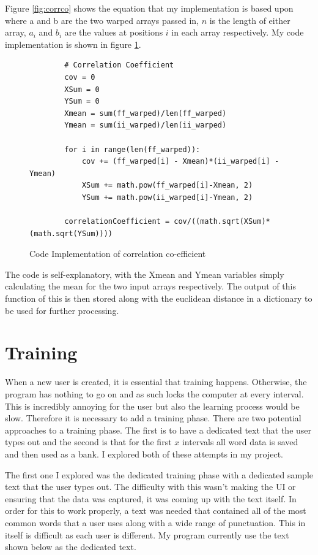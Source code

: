 \documentclass[10pt,a4paper]{report}
\begin{document}
Figure \ref{fig:corrco} shows the equation that my implementation is based upon where a and b are the two warped arrays passed in, \(n\) is the length of either array, \(a_i\) and \(b_i\) are the values at positions \(i\) in each array respectively. My code implementation is shown in figure \ref{fig:CodeCorr}.

\begin{figure}[h!]
	\begin{lstlisting}
		# Correlation Coefficient
        cov = 0
        XSum = 0
        YSum = 0
        Xmean = sum(ff_warped)/len(ff_warped)
        Ymean = sum(ii_warped)/len(ii_warped)
                    
       	for i in range(len(ff_warped)):
        	cov += (ff_warped[i] - Xmean)*(ii_warped[i] - Ymean)
            XSum += math.pow(ff_warped[i]-Xmean, 2)
            YSum += math.pow(ii_warped[i]-Ymean, 2)
                            
        correlationCoefficient = cov/((math.sqrt(XSum)*(math.sqrt(YSum))))
       \end{lstlisting}
       \caption{Code Implementation of correlation co-efficient}
       \label{fig:CodeCorr}
\end{figure}

The code is self-explanatory, with the Xmean and Ymean variables simply calculating the mean for the two input arrays respectively. The output of this function of this is then stored along with the euclidean distance in a dictionary to be used for further processing.

\section{Training}
When a new user is created, it is essential that training happens. Otherwise, the program has nothing to go on and as such locks the computer at every interval. This is incredibly annoying for the user but also the learning process would be slow. Therefore it is necessary to add a training phase. There are two potential approaches to a training phase. The first is to have a dedicated text that the user types out and the second is that for the first \(x\) intervals all word data is saved and then used as a bank. I explored both of these attempts in my project.

The first one I explored was the dedicated training phase with a dedicated sample text that the user types out. The difficulty with this wasn't making the UI or ensuring that the data was captured, it was coming up with the text itself. In order for this to work properly, a text was needed that contained all of the most common words that a user uses along with a wide range of  punctuation. This in itself is difficult as each user is different. My program currently use the text shown below as the dedicated text.
\end{document}
